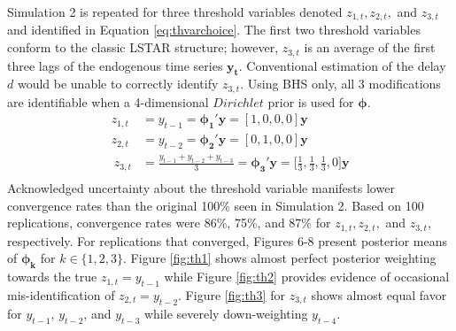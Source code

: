 Simulation 2 is repeated for three threshold variables denoted $z_{1,t},z_{2,t},$ and $z_{3,t}$ and identified in Equation \ref{eq:thvarchoice}. The first two threshold variables conform to the classic LSTAR structure; however, $z_{3,t}$ is an average of the first three lags of the endogenous time series $\bm{y_t}$. Conventional estimation of the delay $d$ would be unable to correctly identify $z_{3,t}$. Using BHS only, all 3 modifications are identifiable when a 4-dimensional $Dirichlet$ prior is used for $\bm{\phi}$.
 \begin{equation}
\label{eq:thvarchoice}
\begin{split}
	z_{1,t}&=y_{t-1}=\bm{\phi_1}'\bm{y}=[1,0,0,0]\bm{y}\\
	z_{2,t}&=y_{t-2}=\bm{\phi_2}'\bm{y}=[0,1,0,0]\bm{y}\\\
	z_{3,t}&=\frac{y_{t-1}+y_{t-2}+y_{t-3}}{3}=\bm{\phi_3}'\bm{y}=\bigg[\frac{1}{3},\frac{1}{3},\frac{1}{3},0\bigg]\bm{y}\\\
\end{split}
\end{equation}
Acknowledged uncertainty about the threshold variable manifests lower convergence rates than the original 100\% seen in Simulation 2. Based on 100 replications, convergence rates were 86\%, 75\%, and 87\% for  $z_{1,t}, z_{2,t},$ and $z_{3,t}$, respectively. For replications that converged, Figures 6-8 present posterior means of $\bm{\phi_k}$ for $k \in\{1,2,3\}$. Figure \ref{fig:th1} shows almost perfect posterior weighting towards the true $z_{1,t}=y_{t-1}$ while Figure \ref{fig:th2} provides evidence of occasional mis-identification of $z_{2,t}=y_{t-2}$. Figure \ref{fig:th3} for $z_{3,t}$ shows almost equal favor for $y_{t-1}$, $y_{t-2}$,  and $y_{t-3}$ while severely down-weighting $y_{t-4}$.

